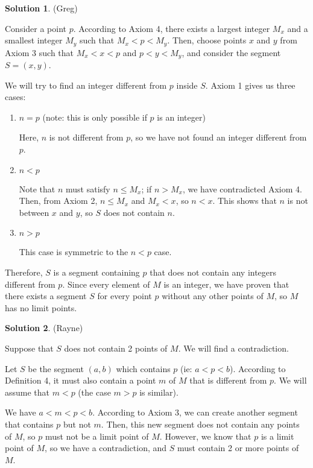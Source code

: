 \documentclass{article}
\theoremstyle{definition}
\newtheorem{solution}{Solution}
\begin{document}
\begin{solution} %
(Greg)

Consider a point $p$.
According to Axiom 4, there exists a largest integer $M_x$ and a smallest integer $M_y$ such that $M_x < p < M_y$.
Then, choose points $x$ and $y$ from Axiom 3 such that $M_x < x < p$ and $p < y < M_y$, and consider the segment $S = (x, y)$.

We will try to find an integer different from $p$ inside $S$.
Axiom 1 gives us three cases:

\begin{enumerate}
\item $n = p$ (note: this is only possible if $p$ is an integer)

Here, $n$ is not different from $p$, so we have not found an integer different from $p$.

\item $n < p$

Note that $n$ must satisfy $n \leq M_x$; if $n > M_x$, we have contradicted Axiom 4.
Then, from Axiom 2, $n \leq M_x$ and $M_x < x$, so $n < x$.
This shows that $n$ is not between $x$ and $y$, so $S$ does not contain $n$.

\item $n > p$

This case is symmetric to the $n < p$ case.

\end{enumerate}

Therefore, $S$ is a segment containing $p$ that does not contain any integers different from $p$.
Since every element of $M$ is an integer, we have proven that there exists a segment $S$ for every point $p$ without any other points of $M$, so $M$ has no limit points.

\end{solution}

\begin{solution} %
(Rayne)

Suppose that $S$ does not contain 2 points of $M$. We will find a contradiction.

Let $S$ be the segment $(a, b)$ which contains $p$ (ie: $a < p < b$).  
According to Definition 4, it must also contain a point $m$ of $M$ that is different from $p$.
We will assume that $m < p$ (the case $m > p$ is similar).

We have $a < m < p < b$. 
According to Axiom 3, we can create another segment that contains $p$ but not $m$.
Then, this new segment does not contain any points of $M$, so $p$ must not be a limit point of $M$. 
However, we know that $p$ is a limit point of $M$, so we have a contradiction, and $S$ must contain 2 or more points of $M$.
\end{solution}
\end{document}
